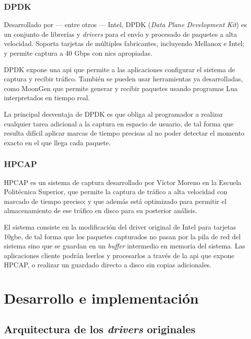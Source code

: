 \documentclass[oneside, draft]{epstfg}
\begin{document}
\subsection{DPDK}

Desarrollado por --- entre otros --- Intel, DPDK (\textit{Data Plane Development Kit}) \cite{IntelDPDK} es un conjunto de librerías y \textit{drivers} para el envío y procesado de paquetes a alta velocidad. Soporta tarjetas de múltiples fabricantes, incluyendo Mellanox e Intel; y permite captura a 40 Gbps con \glspl{nic} apropiadas.

DPDK expone una \gls{api} que permite a las aplicaciones configurar el sistema de captura y recibir tráfico. También se pueden usar herramientas ya desarrolladas, como MoonGen \cite{emmerich2015moongen} que permite generar y recibir paquetes usando programas Lua interpretados en tiempo real.

La principal desventaja de DPDK es que obliga al programador a realizar cualquier tarea adicional a la captura en espacio de usuario, de tal forma que resulta difícil aplicar marcas de tiempo precisas al no poder detectar el momento exacto en el que llega cada paquete.

\subsection{HPCAP}

HPCAP \cite{victorPhD} es un sistema de captura desarrollado por Víctor Moreno en la Escuela Politécnica Superior, que permite la captura de tráfico a alta velocidad con marcado de tiempo preciso; y que además está optimizado para permitir el almacenamiento de ese tráfico en disco para su posterior análisis.

El sistema consiste en la modificación del \gls{driver} original de Intel para tarjetas \gls{10gbe}, de tal forma que los paquetes capturados no pasan por la pila de red del sistema sino que se guardan en un \textit{buffer} intermedio en memoria del sistema. Las aplicaciones cliente podrán leerlos y procesarlos a través de la \gls{api} que expone HPCAP, o realizar un guardado directo a disco sin copias adicionales.

\chapter{Desarrollo e implementación}

\section{Arquitectura de los \textit{drivers} originales}
\label{sec:ArquitecturaOriginal}
\end{document}
